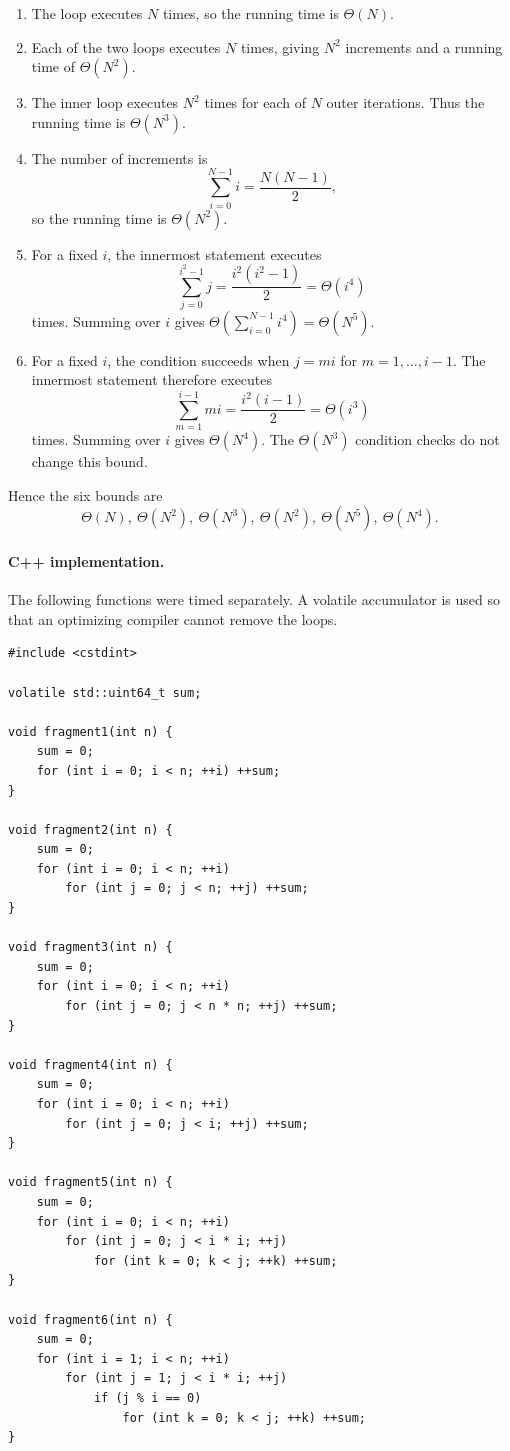 \documentclass[12pt,a4paper]{article}
\begin{document}
\begin{enumerate}
  \item[(1)] The loop executes $N$ times, so the running time is
  $\Theta(N)$.

  \item[(2)] Each of the two loops executes $N$ times, giving
  $N^2$ increments and a running time of $\Theta(N^2)$.

  \item[(3)] The inner loop executes $N^2$ times for each of $N$ outer
  iterations. Thus the running time is $\Theta(N^3)$.

  \item[(4)] The number of increments is
  \[
    \sum_{i=0}^{N-1}i=\frac{N(N-1)}{2},
  \]
  so the running time is $\Theta(N^2)$.

  \item[(5)] For a fixed $i$, the innermost statement executes
  \[
    \sum_{j=0}^{i^2-1}j=\frac{i^2(i^2-1)}{2}=\Theta(i^4)
  \]
  times. Summing over $i$ gives
  $\Theta(\sum_{i=0}^{N-1}i^4)=\Theta(N^5)$.

  \item[(6)] For a fixed $i$, the condition succeeds when $j=mi$ for
  $m=1,\ldots,i-1$. The innermost statement therefore executes
  \[
    \sum_{m=1}^{i-1}mi
    =\frac{i^2(i-1)}{2}
    =\Theta(i^3)
  \]
  times. Summing over $i$ gives $\Theta(N^4)$. The $\Theta(N^3)$
  condition checks do not change this bound.
\end{enumerate}

Hence the six bounds are
\[
\boxed{\Theta(N),\ \Theta(N^2),\ \Theta(N^3),\
       \Theta(N^2),\ \Theta(N^5),\ \Theta(N^4)}.
\]

\paragraph{C++ implementation.}
The following functions were timed separately. A volatile accumulator is
used so that an optimizing compiler cannot remove the loops.

\begin{lstlisting}
#include <cstdint>

volatile std::uint64_t sum;

void fragment1(int n) {
    sum = 0;
    for (int i = 0; i < n; ++i) ++sum;
}

void fragment2(int n) {
    sum = 0;
    for (int i = 0; i < n; ++i)
        for (int j = 0; j < n; ++j) ++sum;
}

void fragment3(int n) {
    sum = 0;
    for (int i = 0; i < n; ++i)
        for (int j = 0; j < n * n; ++j) ++sum;
}

void fragment4(int n) {
    sum = 0;
    for (int i = 0; i < n; ++i)
        for (int j = 0; j < i; ++j) ++sum;
}

void fragment5(int n) {
    sum = 0;
    for (int i = 0; i < n; ++i)
        for (int j = 0; j < i * i; ++j)
            for (int k = 0; k < j; ++k) ++sum;
}

void fragment6(int n) {
    sum = 0;
    for (int i = 1; i < n; ++i)
        for (int j = 1; j < i * i; ++j)
            if (j % i == 0)
                for (int k = 0; k < j; ++k) ++sum;
}
\end{lstlisting}
\end{document}

